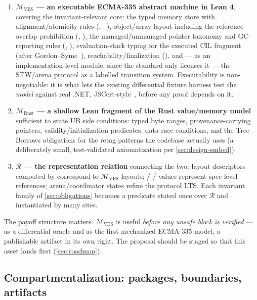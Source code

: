 \begin{enumerate}[leftmargin=1.6em]
\item \textbf{$\mathcal{M}_{\mathrm{VES}}$ --- an executable ECMA-335
  abstract machine in Lean 4}, covering the invariant-relevant core: the
  typed memory store with alignment/atomicity rules
  (, --), object/array
  layout including the reference-overlap prohibition (,
  ), the managed/unmanaged pointer taxonomy and
  GC-reporting rules (, ), evaluation-stack
  typing for the executed CIL fragment (after
  Gordon--Syme~\cite{gordonsyme2001}), reachability/finalization
  (), and --- as an implementation-level module, since the
  standard only licenses it --- the STW/arena protocol as a labelled
  transition system. Executability is non-negotiable: it is what lets
  the existing differential fixture harness test the \emph{model}
  against real .NET, JSCert-style~\cite{jscert2014}, before any proof
  depends on it.
\item \textbf{$\mathcal{M}_{\mathrm{Rust}}$ --- a shallow Lean fragment
  of the Rust value/memory model} sufficient to state UB side conditions:
  typed byte ranges, provenance-carrying pointers, validity/initialization
  predicates, data-race conditions, and the Tree Borrows obligations for
  the retag patterns the codebase actually uses (a deliberately small,
  test-validated axiomatization per \cref{sec:design-embed}).
\item \textbf{$\mathcal{R}$ --- the representation relation} connecting
  the two: layout descriptors computed by  correspond
  to $\mathcal{M}_{\mathrm{VES}}$ layouts; /%
  / values represent spec-level
  references; arena/coordinator states refine the protocol LTS. Each
  invariant family of \cref{sec:obligations} becomes a predicate stated
  once over $\mathcal{R}$ and instantiated by many \safetyc{} sites.
\end{enumerate}

The payoff structure matters: $\mathcal{M}_{\mathrm{VES}}$ is useful
\emph{before any unsafe block is verified} --- as a differential oracle
and as the first mechanized ECMA-335 model, a publishable artifact in
its own right. The proposal should be staged so that this asset lands
first (\cref{sec:roadmap}).

\subsection{Compartmentalization: packages, boundaries, artifacts}
\label{sec:design-compart}

